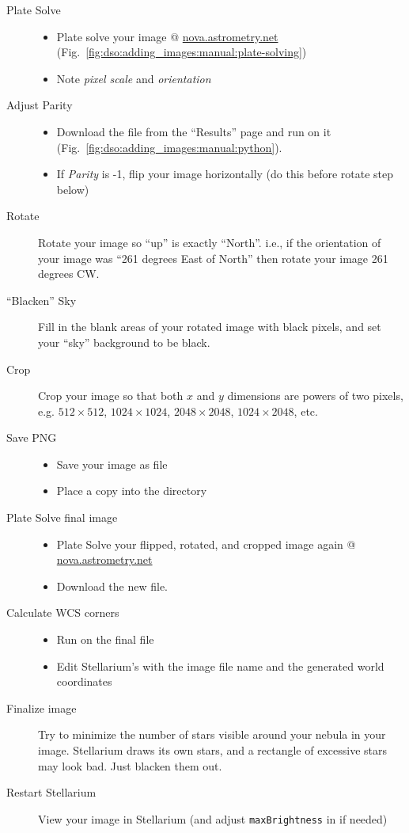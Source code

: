 \begin{description}
\item[Plate Solve]\mbox{}
  \begin{itemize}
  \item Plate solve your image @ \url{nova.astrometry.net} (Fig.~\ref{fig:dso:adding_images:manual:plate-solving})
  \item Note \emph{pixel scale} and \emph{orientation}
  \end{itemize}
\item[Adjust Parity]\mbox{}
  \begin{itemize}
  \item Download the  file from the ``Results'' page and run  on it (Fig.~\ref{fig:dso:adding_images:manual:python}).
  \item If \emph{Parity} is -1, flip your image horizontally (do this before rotate step below)
  \end{itemize}
\item[Rotate]
  Rotate your image so ``up'' is exactly ``North''. i.e., if the orientation of your image was ``261 degrees East of North'' then rotate your image 261 degrees CW.
\item[``Blacken'' Sky]
  Fill in the blank areas of your rotated image with black pixels, and set your ``sky'' background to be black.
\item[Crop]
  Crop your image so that both $x$ and $y$ dimensions are powers of two pixels, e.g. $512\times512$, $1024\times1024$, $2048\times2048$, $1024\times2048$, etc.
\item[Save PNG]\mbox{}
  \begin{itemize}
  \item Save your image as  file
  \item Place a copy into the  directory
  \end{itemize}
\item[Plate Solve final image]\mbox{}
  \begin{itemize}
  \item Plate Solve your flipped, rotated, and cropped image again @ \url{nova.astrometry.net}
  \item Download the new  file.
  \end{itemize}
\item[Calculate WCS corners]\mbox{}
  \begin{itemize}
  \item Run  on the final  file
  \item Edit Stellarium's  with the image file name and the generated world coordinates
  \end{itemize}
\item[Finalize image]
  Try to minimize the number of stars visible around your nebula in your image. Stellarium draws its own stars, and a rectangle of excessive stars may look bad. Just blacken them out. 
\item[Restart Stellarium]
  View your image in Stellarium (and adjust \texttt{maxBrightness} in  if needed)
\end{description}

